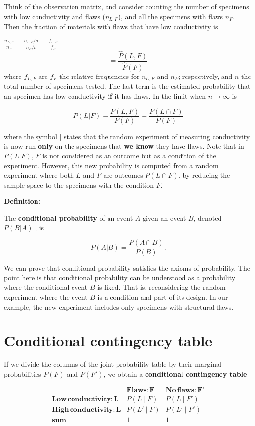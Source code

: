 \documentclass[
]{book}
\begin{document}
Think of the observation matrix, and consider counting the number of specimens with low conductivity and flaws (\(n_{L,F}\)), and all the specimens with flaws \(n_{F}\). Then the fraction of materials with flaws that have low conductivity is

\(\frac{n_{L,F}}{n_{F}}=\frac{n_{L,F}/n}{n_{F}/n}= \frac{f_{L,F}}{f_{F}}\)
\[= \frac{\hat{P}( L,F )}{\hat{P}(F)}\]
where \(f_{L,F}\) are \(f_{F}\) the relative frequencies for \(n_{L,F}\) and \(n_{F}\); respectively, and \(n\) the total number of specimens tested. The last term is the estimated probability that an specimen has low conductivity \textbf{if} it has flaws. In the limit when \(n \rightarrow \infty\) is

\[P(L| F)= \frac{P(L,F)}{P(F)}=\frac{P(L\cap F)}{P(F)}\]

where the symbol \(|\) states that the random experiment of measuring conductivity is now run \textbf{only} on the specimens that \textbf{we know} they have flaws. Note that in \(P(L| F)\), \(F\) is not considered as an outcome but as a condition of the experiment. However, this new probability is computed from a random experiment where both \(L\) and \(F\) are outcomes \(P(L\cap F)\), by reducing the sample space to the specimens with the condition \(F\).

\textbf{Definition:}

The \textbf{conditional probability} of an event \(A\) given an event \(B\), denoted \(P(B| A)\) , is

\[P(A|B) = \frac{P(A\cap B)}{P(B)}.\]

We can prove that conditional probability satisfies the axioms of probability. The point here is that conditional probability can be understood as a probability where the conditional event \(B\) is fixed. That is, reconsidering the random experiment where the event \(B\) is a condition and part of its design. In our example, the new experiment includes only specimens with structural flaws.

\hypertarget{conditional-contingency-table}{%
\section{Conditional contingency table}\label{conditional-contingency-table}}

If we divide the columns of the joint probability table by their marginal probabilities \(P(F)\) and \(P(F')\), we obtain a \textbf{conditional contingency table}

\[
\begin{array}{cc|c}
    & \mathbf{Flaws: F} & \mathbf{No\, flaws: F'} \\ 
    \mathbf{Low\, conductivity: L} & P(L \mid F) & P(L \mid F') \\ 
    \mathbf{High\, conductivity: L} & P(L' \mid F) & P(L' \mid F') \\ 
    \mathbf{sum} & 1 & 1
\end{array}
\]
\end{document}
